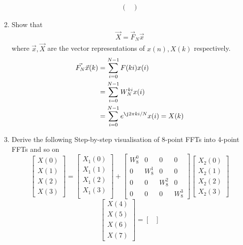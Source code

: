 \documentclass[journal,12pt,twocolumn]{IEEEtran}
\renewcommand\thesection{\arabic{section}}
\begin{document}
\begin{enumerate}[label=\arabic*.,ref=\thesection.\theenumi]
\begin{align}
\begin{pmatrix}
        \end{pmatrix}
    \end{align}
\item Show that 
    \begin{align}
	    \vec{X} = \vec{F}_N \vec{x}
	    \label{eq:dft-mat-def}
    \end{align}
		where $\vec{x}, \vec{X}$ are the vector representations of $x(n), X(k)$ respectively.\\
		\solution \begin{align}
		    \vec{F_N}\vec{x}(k) &= \sum_{i=0}^{N-1}F(ki)x(i)\\
		    &=  \sum_{i=0}^{N-1}W_N^{ki}x(i)\\
		    &=  \sum_{i=0}^{N-1}e^{\j2\pi ki/N}x(i) = X(k)
		\end{align}
\item Derive the following Step-by-step visualisation  of
8-point FFTs into 4-point FFTs and so on
\begin{equation}
\begin{bmatrix}
X(0) \\ 
X(1) \\ 
X(2) \\ 
X(3)
\end{bmatrix}
=
\begin{bmatrix}
X_{1}(0) \\ 
X_{1}(1)\\ 
X_{1}(2)\\
X_{1}(3)\\
\end{bmatrix}
+
\begin{bmatrix}
W^{0}_{8} & 0 & 0 & 0\\
0 & W^{1}_{8} & 0 & 0\\
0 & 0 & W^{2}_{8} & 0\\
0 & 0 & 0 & W^{3}_{8}
\end{bmatrix}
\begin{bmatrix}
X_{2}(0) \\ 
X_{2}(1) \\ 
X_{2}(2) \\
X_{2}(3)
\end{bmatrix}
\end{equation}
\begin{equation}
\begin{bmatrix}
X(4) \\ 
X(5) \\ 
X(6) \\ 
X(7)
\end{bmatrix}
=
\begin{bmatrix}

\end{bmatrix}
\end{equation}
\end{enumerate}
\end{document}
